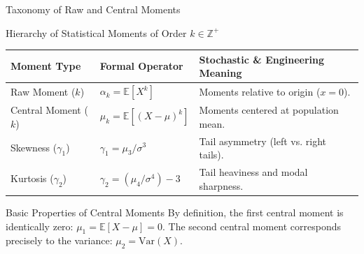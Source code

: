 \documentclass[aspectratio=169,xcolor={dvipsnames,table}]{beamer}
\begin{document}
\begin{frame}{Taxonomy of Raw and Central Moments}
	\begin{block}{Hierarchy of Statistical Moments of Order $k \in \mathbb{Z}^+$}
		\scriptsize
		\centering
		\begin{tabular}{p{2.8cm}|p{2.8cm}|p{6.4cm}}
			\toprule
			\textbf{Moment Type} & \textbf{Formal Operator} & \textbf{Stochastic \& Engineering Meaning} \\
			\midrule
			Raw Moment ($k$) & $\alpha_k = \mathbb{E}[X^k]$ & Moments relative to origin ($x=0$). \\
			\midrule
			Central Moment ($k$) & $\mu_k = \mathbb{E}[(X - \mu)^k]$ & Moments centered at population mean. \\
			\midrule
			Skewness ($\gamma_1$) & $\gamma_1 = \mu_3 / \sigma^3$ & Tail asymmetry (left vs. right tails). \\
			\midrule
			Kurtosis ($\gamma_2$) & $\gamma_2 = (\mu_4 / \sigma^4) - 3$ & Tail heaviness and modal sharpness. \\
			\bottomrule
		\end{tabular}
	\end{block}
	\vspace{-0.15cm}
	\begin{alertblock}{Basic Properties of Central Moments}
		\footnotesize
		By definition, the first central moment is identically zero: $\mu_1 = \mathbb{E}[X - \mu] = 0$. The second central moment corresponds precisely to the variance: $\mu_2 = \text{Var}(X)$.
	\end{alertblock}
\end{frame}
\end{document}
